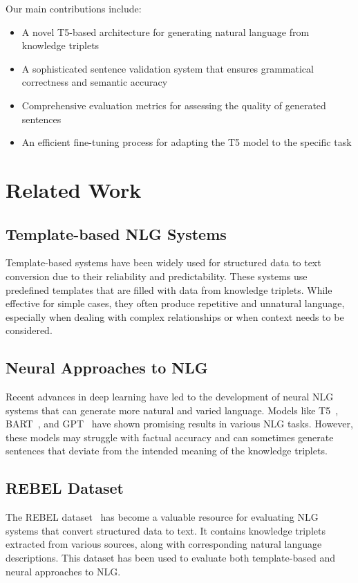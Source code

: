 \documentclass[3p,times,procedia]{elsarticle}
\begin{document}
Our main contributions include:
\begin{itemize}
    \item A novel T5-based architecture for generating natural language from knowledge triplets
    \item A sophisticated sentence validation system that ensures grammatical correctness and semantic accuracy
    \item Comprehensive evaluation metrics for assessing the quality of generated sentences
    \item An efficient fine-tuning process for adapting the T5 model to the specific task
\end{itemize}

\section{Related Work}
\subsection{Template-based NLG Systems}
Template-based systems have been widely used for structured data to text conversion due to their reliability and predictability. These systems use predefined templates that are filled with data from knowledge triplets. While effective for simple cases, they often produce repetitive and unnatural language, especially when dealing with complex relationships or when context needs to be considered.

\subsection{Neural Approaches to NLG}
Recent advances in deep learning have led to the development of neural NLG systems that can generate more natural and varied language. Models like T5~\cite{raffel2020t5}, BART~\cite{lewis2020bart}, and GPT~\cite{radford2019gpt2} have shown promising results in various NLG tasks. However, these models may struggle with factual accuracy and can sometimes generate sentences that deviate from the intended meaning of the knowledge triplets.

\subsection{REBEL Dataset}
The REBEL dataset~\cite{huguetcabot2021rebel} has become a valuable resource for evaluating NLG systems that convert structured data to text. It contains knowledge triplets extracted from various sources, along with corresponding natural language descriptions. This dataset has been used to evaluate both template-based and neural approaches to NLG.
\end{document}
